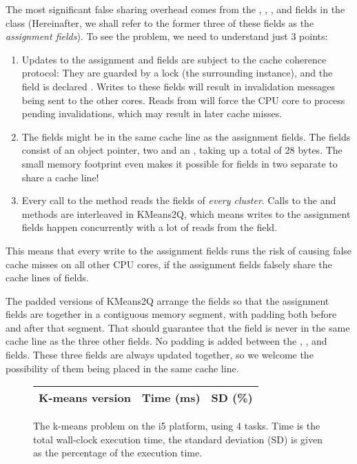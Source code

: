 The most significant false sharing overhead comes from the ,
, , and  fields in the 
class (Hereinafter, we shall refer to the former three of these fields as
the \textit{assignment fields}). To see the problem, we need to understand just
3 points:

\begin{enumerate}
	\item{Updates to the assignment and  fields
		are subject to the cache coherence protocol:
		They are guarded by a lock (the surrounding  instance),
		and the  field is declared }.
		Writes to these fields will result in invalidation
		messages being sent to the other cores. Reads from 
		will force the CPU core to process pending invalidations, which
		may result in later cache misses.
	\item {The  fields might be in the same cache line as the
		assignment fields. The fields consist of an object pointer, two
		 and an , taking up a total of 28
		bytes. The small memory footprint even makes it possible for
		fields in two separate  to share a cache
		line!}
	\item {Every call to the  method reads the 
		fields of \textit{every cluster}. Calls to the 
		and  methods are interleaved in KMeans2Q, which
		means writes to the assignment fields happen concurrently with
		a lot of reads from the  field.}
\end{enumerate}

This means that every write to the assignment fields runs the risk of causing
false cache misses on all other CPU cores, if the assignment fields falsely
share the cache lines of  fields.

The padded versions of KMeans2Q arrange the fields so that the assignment fields
are together in a contiguous memory segment, with padding both before and after
that segment. That should guarantee that the  field is never in the
same cache line as the three other fields. No padding is added between the
, , and  fields. These three fields are always
updated together, so we welcome the possibility of them being placed in the
same cache line.

\begin{figure}[hbtp]
	\centering
	\begin{tabular}{l r r}
		\hline
		\hline
		K-means version & Time (ms) & SD (\%) \\
		\hline
		
		\hline
		\hline
	\end{tabular}
	\caption{The k-means problem on the i5 platform, using 4 tasks. Time is
	the total wall-clock execution time, the standard deviation (SD) is
	given as the percentage of the execution time.}
	\label{table:kmeans-i5}
\end{figure}

